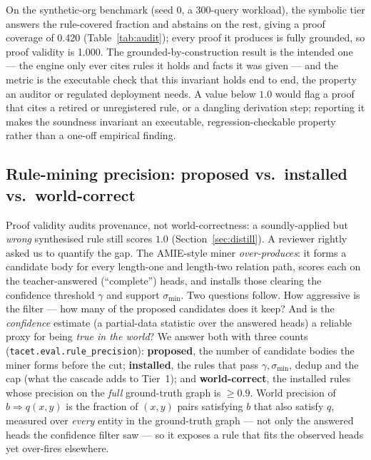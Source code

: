 \documentclass[11pt]{article}
\theoremstyle{plain}
\newcommand{\proofValidity}{1.000}
\newcommand{\proofCoverage}{0.420}
\begin{document}
\begin{table}[t]
\centering
\caption{Proof coverage and validity on the synthetic KGQA benchmark.}
\label{tab:audit}

\end{table}

On the synthetic-org benchmark (seed $0$, a $300$-query workload), the symbolic
tier answers the rule-covered fraction and abstains on the rest, giving a proof
coverage of \proofCoverage{} (Table~\ref{tab:audit}); every proof it produces is
fully grounded, so proof validity is \proofValidity{}. The grounded-by-construction result is the
intended one --- the engine only ever cites rules it holds and facts it was
given --- and the metric is the executable check that this invariant holds end
to end, the property an auditor or regulated deployment needs. A value below
$1.0$ would flag a proof that cites a retired or unregistered rule, or a
dangling derivation step; reporting it makes the soundness invariant an
executable, regression-checkable property rather than a one-off empirical
finding.

\subsection{Rule-mining precision: proposed vs.\ installed vs.\ world-correct}
\label{sec:rule_precision}

Proof validity audits provenance, not world-correctness: a soundly-applied but
\emph{wrong} synthesised rule still scores $1.0$
(Section~\ref{sec:distill}). A reviewer rightly asked us to quantify the gap. The
AMIE-style miner \emph{over-produces}: it forms a candidate body for every
length-one and length-two relation path, scores each on the teacher-answered
(``complete'') heads, and installs those clearing the confidence threshold
$\gamma$ and support $\sigma_{\mathrm{min}}$. Two questions follow. How aggressive is the
filter --- how many of the proposed candidates does it keep? And is the
\emph{confidence} estimate (a partial-data statistic over the answered heads) a
reliable proxy for being \emph{true in the world}? We answer both with three
counts (\texttt{tacet.eval.rule\_precision}):
\textbf{proposed}, the number of candidate bodies the miner forms before the
cut; \textbf{installed}, the rules that pass $\gamma,\sigma_{\mathrm{min}}$, dedup and the cap
(what the cascade adds to Tier~1); and \textbf{world-correct}, the installed
rules whose precision on the \emph{full} ground-truth graph is $\ge 0.9$. World
precision of $b\Rightarrow q(x,y)$ is the fraction of $(x,y)$ pairs satisfying
$b$ that also satisfy $q$, measured over \emph{every} entity in the ground-truth
graph --- not only the answered heads the confidence filter saw --- so it
exposes a rule that fits the observed heads yet over-fires elsewhere.
\end{document}
